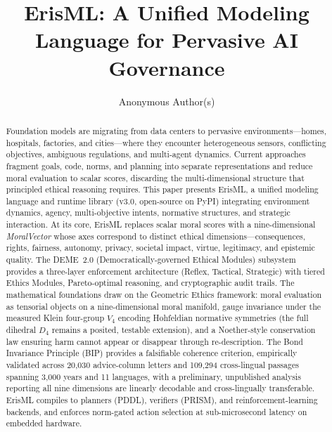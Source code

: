 \documentclass[conference]{IEEEtran}
\begin{document}
\title{ErisML: A Unified Modeling Language for Pervasive AI Governance}

\author{Anonymous Author(s)}

\maketitle

\begin{abstract}
Foundation models are migrating from data centers to pervasive environments---homes, hospitals, factories, and cities---where they encounter heterogeneous sensors, conflicting objectives, ambiguous regulations, and multi-agent dynamics. Current approaches fragment goals, code, norms, and planning into separate representations and reduce moral evaluation to scalar scores, discarding the multi-dimensional structure that principled ethical reasoning requires. This paper presents ErisML, a unified modeling language and runtime library (v3.0, open-source on PyPI) integrating environment dynamics, agency, multi-objective intents, normative structures, and strategic interaction. At its core, ErisML replaces scalar moral scores with a nine-dimensional \emph{MoralVector} whose axes correspond to distinct ethical dimensions---consequences, rights, fairness, autonomy, privacy, societal impact, virtue, legitimacy, and epistemic quality. The DEME~2.0 (Democratically-governed Ethical Modules) subsystem provides a three-layer enforcement architecture (Reflex, Tactical, Strategic) with tiered Ethics Modules, Pareto-optimal reasoning, and cryptographic audit trails. The mathematical foundations draw on the Geometric Ethics framework: moral evaluation as tensorial objects on a nine-dimensional moral manifold, gauge invariance under the measured Klein four-group $V_4$ encoding Hohfeldian normative symmetries (the full dihedral $D_4$ remains a posited, testable extension), and a Noether-style conservation law ensuring harm cannot appear or disappear through re-description. The Bond Invariance Principle (BIP) provides a falsifiable coherence criterion, empirically validated across 20,030 advice-column letters and 109,294 cross-lingual passages spanning 3,000 years and 11 languages, with a preliminary, unpublished analysis reporting all nine dimensions are linearly decodable and cross-lingually transferable. ErisML compiles to planners (PDDL), verifiers (PRISM), and reinforcement-learning backends, and enforces norm-gated action selection at sub-microsecond latency on embedded hardware.
\end{abstract}
\end{document}

